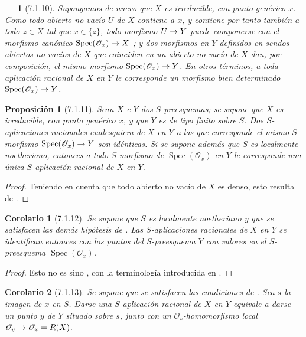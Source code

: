 \documentclass[oneside]{amsart}
\theoremstyle{ega-env-style}
\newtheorem*{env}{---}
\theoremstyle{ega-thm-env-style}
\newtheorem*{proposition}{Proposición}
\newtheorem*{corollary}{Corolario}
\theoremstyle{ega-defn-env-style}
\renewcommand{\to}{\mathchoice{\longrightarrow}{\rightarrow}{\rightarrow}{\rightarrow}}
\newcommand{\oldpage}[2][]{{\marginnote{\normalfont{\textbf{#1}~|~#2}}}\ignorespaces}
\let\EGAOriginalLabel\label
\renewcommand{\label}[1]{\phantomsection\EGAOriginalLabel{#1}}
\begin{document}
\begin{env}[7.1.10]
\label{I.7.1.10}
Supongamos de nuevo que $X$ es irreducible, con punto genérico $x$.
Como todo abierto no vacío $U$ de $X$ contiene a $x$, y contiene por tanto también a todo $z\in X$ tal que $x\in\overline{\{z\}}$, todo morfismo $U\to Y$ puede componerse con el morfismo canónico $\operatorname{Spec}(\mathscr{O}_x)\to X$ ; y dos morfismos en $Y$ definidos en sendos abiertos no vacíos de $X$ que coinciden en un abierto no vacío de $X$ dan, por composición, el mismo morfismo $\operatorname{Spec}(\mathscr{O}_x)\to Y$.
En otros términos, a toda aplicación racional de $X$ en $Y$ le corresponde un morfismo bien determinado $\operatorname{Spec}(\mathscr{O}_x)\to Y$.
\end{env}

\oldpage[I]{158}
\begin{proposition}[7.1.11]
\label{I.7.1.11}
Sean $X$ e $Y$ dos $S$-preesquemas; se supone que $X$ es irreducible, con punto genérico $x$, y que $Y$ es de tipo finito sobre $S$.
Dos $S$-aplicaciones racionales cualesquiera de $X$ en $Y$ a las que corresponde el mismo $S$-morfismo $\operatorname{Spec}(\mathscr{O}_x)\to Y$ son idénticas.
Si se supone además que $S$ es localmente noetheriano, entonces a todo $S$-morfismo de $\operatorname{Spec}(\mathscr{O}_x)$ en $Y$ le corresponde una única $S$-aplicación racional de $X$ en $Y$.
\end{proposition}

\begin{proof}
Teniendo en cuenta que todo abierto no vacío de $X$ es denso, esto resulta de .
\end{proof}

\begin{corollary}[7.1.12]
\label{I.7.1.12}
Se supone que $S$ es localmente noetheriano y que se satisfacen las demás hipótesis de .
Las $S$-aplicaciones racionales de $X$ en $Y$ se identifican entonces con los puntos del $S$-preesquema $Y$ con valores en el $S$-preesquema $\operatorname{Spec}(\mathscr{O}_x)$.
\end{corollary}

\begin{proof}
Esto no es sino , con la terminología introducida en .
\end{proof}

\begin{corollary}[7.1.13]
\label{I.7.1.13}
Se supone que se satisfacen las condiciones de .
Sea $s$ la imagen de $x$ en $S$.
Darse una $S$-aplicación racional de $X$ en $Y$ equivale a darse un punto $y$ de $Y$ situado sobre $s$, junto con un $\mathscr{O}_s$-homomorfismo local $\mathscr{O}_y\to\mathscr{O}_x=R(X)$.
\end{corollary}
\end{document}
